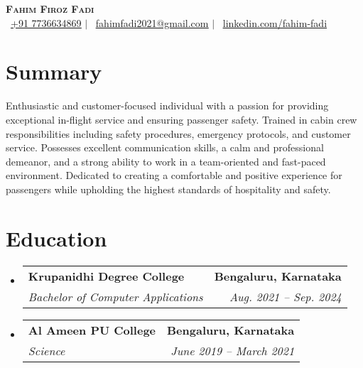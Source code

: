 \documentclass[a4paper,11pt]{article}
\makeatletter
\newcommand{\resumeSubheading}[4]{
	\vspace{-2pt}\item
		\begin{tabular*}{0.97\textwidth}[t]{l@{\extracolsep{\fill}}r}
			\textbf{#1} & \textbf{\small #2} \\
			\textit{\small#3} & \textit{\small #4} \\
		\end{tabular*}\vspace{-7pt}
}
\newcommand{\resumeSubHeadingListStart}{\begin{itemize}[leftmargin=0.15in, label={}]}
\newcommand{\resumeSubHeadingListEnd}{\end{itemize}}
\makeatother
\begin{document}
\begin{center}
	{\selectfont \textbf{\Huge \scshape{Fahim Firoz Fadi}}} \\ \vspace{1pt}
	\small{
		\raisebox{-0.1\height}\faPhone\ \href{tel:+917736634869}{\underline{+91 7736634869}} $|$
		\raisebox{-0.2\height}\faEnvelope\ \href{mailto:fahimfadi2021@gmail.com}{\underline{fahimfadi2021@gmail.com}} $|$
		\raisebox{-0.2\height}\faLinkedin\ \href{https://www.linkedin.com/in/fahim-fadi-816155310}{\underline{linkedin.com/fahim-fadi}}
	}
\end{center}

\section{Summary}
\begin{itemize}[leftmargin=0.15in, label={}]
	\small{\item{
		Enthusiastic and customer-focused individual with a passion for providing exceptional in-flight service and ensuring passenger safety. Trained in cabin crew responsibilities including safety procedures, emergency protocols, and customer service. Possesses excellent communication skills, a calm and professional demeanor, and a strong ability to work in a team-oriented and fast-paced environment. Dedicated to creating a comfortable and positive experience for passengers while upholding the highest standards of hospitality and safety.
				}}
\end{itemize}
\section{Education}
\resumeSubHeadingListStart
\resumeSubheading
{Krupanidhi Degree College}{Bengaluru, Karnataka}
{Bachelor of Computer Applications}{Aug. 2021 -- Sep. 2024}
\resumeSubheading
{Al Ameen PU College}{Bengaluru, Karnataka}
{Science}{June 2019 -- March 2021}
\resumeSubHeadingListEnd

\end{document}
